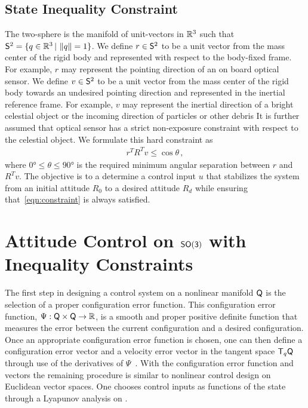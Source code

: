 \documentclass[letterpaper, 10 pt, conference]{ieeeconf}  %
\begin{document}
\subsection{State Inequality Constraint}

The two-sphere is the manifold of unit-vectors in \( \mathbb{R}^3 \) such that \( \mathsf{S}^2 = \{ q \in \mathbb{R}^3 \,  \vert \, \left\| q \right\| = 1 \}\).
We define \( r \in \mathsf{S}^2 \) to be a unit vector from the mass center of the rigid body and represented with respect to the body-fixed frame.
For example, \( r \) may represent the pointing direction of an on board optical sensor.
We define \( v \in \mathsf{S}^2 \) to be a unit vector from the mass center of the rigid body towards an undesired pointing direction and represented in the inertial reference frame.
For example, \( v \) may represent the inertial direction of a bright celestial object or the incoming direction of particles or other debris
It is further assumed that optical sensor has a strict non-exposure constraint with respect to the celestial object.
We formulate this hard constraint as
\begin{align}
	r^T R^T v \leq \cos \theta \, , \label{eqn:constraint}
\end{align}
where \( \ang{0} \leq \theta \leq \ang{90}  \) is the required minimum angular separation between \( r \) and \( R^T v \). 
The objective is to a determine a control input \( u \) that stabilizes the system from an initial attitude \( R_0 \) to a desired attitude \( R_d \) while ensuring that~\cref{eqn:constraint} is always satisfied.

\section{Attitude Control on $\mathsf{SO(3)}$ with Inequality Constraints}
The first step in designing a control system on a nonlinear manifold \( \mathsf{Q} \) is the selection of a proper configuration error function.
This configuration error function, \( \Psi : \mathsf{Q} \times \mathsf{Q} \to \mathbb{R} \), is a smooth and proper positive definite function that measures the error between the current configuration and a desired configuration.
Once an appropriate configuration error function is chosen, one can then define a configuration error vector and a velocity error vector in the tangent space \( \mathsf{T}_q \mathsf{Q} \) through use of the derivatives of \( \Psi \)~\cite{bullo2004}.
With the configuration error function and vectors the remaining procedure is similar to nonlinear control design on Euclidean vector spaces.
One chooses control inputs as functions of the state through a Lyapunov analysis on \Q.
\end{document}
